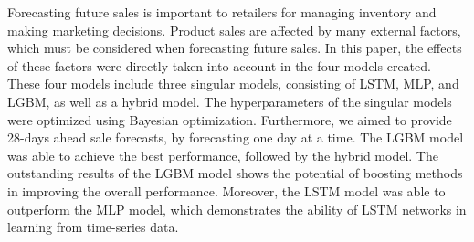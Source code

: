 Forecasting future sales is important to retailers for managing inventory and making marketing decisions. 
Product sales are affected by many external factors, which must be considered when forecasting future sales.
In this paper, the effects of these factors were directly taken into account in the four models created.
These four models include three singular models, consisting of LSTM, MLP, and LGBM, as well as a hybrid model.
The hyperparameters of the singular models were optimized using Bayesian optimization.
Furthermore, we aimed to provide 28-days ahead sale forecasts, by forecasting one day at a time.
The LGBM model was able to achieve the best performance, followed by the hybrid model.
The outstanding results of the LGBM model shows the potential of boosting methods in improving the overall performance.
Moreover, the LSTM model was able to outperform the MLP model, which demonstrates the ability of LSTM networks in learning from time-series data. \newline

\noindent{}